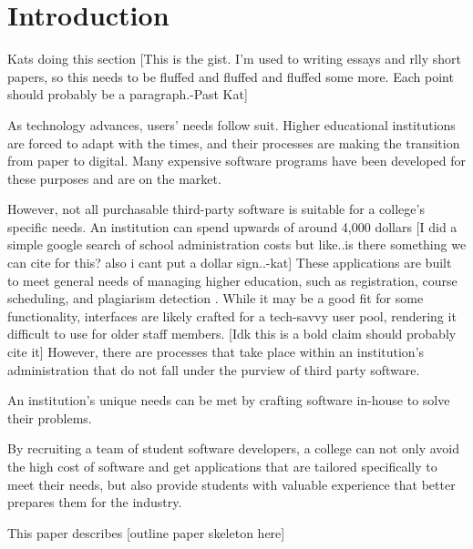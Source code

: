 \section{Introduction}
Kats doing this section
[This is the gist. I'm used to writing essays and rlly short papers, so this needs to be fluffed and fluffed and fluffed some more. Each point should probably be a paragraph.-Past Kat]

As technology advances, users' needs follow suit. Higher educational institutions are forced to adapt with the times, and their processes are making the transition from paper to digital. Many expensive software programs have been developed for these purposes and are on the market. 

However, not all purchasable third-party software is suitable for a college's specific needs. An institution can spend upwards of around 4,000 dollars [I did a simple google search of school administration costs but like..is there something we can cite for this? also i cant put a dollar sign..-kat] These applications are built to meet general needs of managing higher education, such as registration, course scheduling, and plagiarism detection \cite{plagarismsoftware}. While it may be a good fit for some functionality, interfaces are likely crafted for a tech-savvy user pool, rendering it difficult to use for older staff members. [Idk this is a bold claim should probably cite it] However, there are processes that take place within an institution's administration that do not fall under the purview of third party software.

An institution's unique needs can be met by crafting software in-house to solve their problems. 

By recruiting a team of student software developers, a college can not only avoid the high cost of software and get applications that are tailored specifically to meet their needs, but also provide students with valuable experience that better prepares them for the industry. 

This paper describes [outline paper skeleton here]

